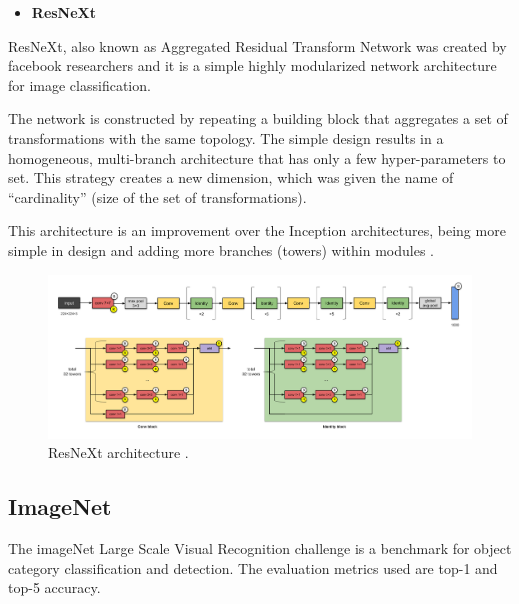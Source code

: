 \begin{itemize}
    \item \textbf{ResNeXt}
\end{itemize}

\label{sec:resnext}
\par ResNeXt, also known as Aggregated Residual Transform Network was created by facebook researchers and it is a simple highly modularized network architecture for image classification. 
\par The network is constructed by repeating a building block that aggregates a set of transformations with the same topology. The simple design results in a homogeneous, multi-branch architecture that has only a few hyper-parameters to set. This strategy creates a new dimension, which was given the name of \enquote{cardinality} (size of the set of transformations). 
\par This architecture is an improvement over the Inception architectures, being more simple in design and adding more branches (towers) within modules \cite{Xie2017}.


\begin{figure}[H]
    \centering
    \captionsetup{justification=centering}
    \includegraphics[width=\textwidth]{Sections/2StateOfTheArt/2_images/resnext.png}
    \caption[ResNeXt architecture.]{ResNeXt architecture \cite{cnnarchitectures}. }
    \label{fig:noisestudent}
\end{figure}


\newpage

\subsection{ImageNet}
\par The imageNet Large Scale Visual Recognition challenge \cite{Russakovsky2015} is a benchmark for object category classification and detection. The evaluation metrics used are top-1 and top-5 accuracy.

